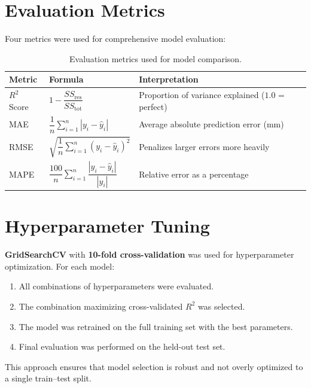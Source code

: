 \section{Evaluation Metrics}

Four metrics were used for comprehensive model evaluation:

\begin{table}[H]
\centering
\caption{Evaluation metrics used for model comparison.}
\label{tab:metrics}
\begin{tabular}{lll}
\toprule
\textbf{Metric} & \textbf{Formula} & \textbf{Interpretation} \\
\midrule
$R^2$ Score & $1 - \dfrac{SS_{\text{res}}}{SS_{\text{tot}}}$ & Proportion of variance explained ($1.0$ = perfect) \\[1em]
MAE & $\dfrac{1}{n}\displaystyle\sum_{i=1}^{n}|y_i - \hat{y}_i|$ & Average absolute prediction error (mm) \\[1em]
RMSE & $\sqrt{\dfrac{1}{n}\displaystyle\sum_{i=1}^{n}(y_i - \hat{y}_i)^2}$ & Penalizes larger errors more heavily \\[1em]
MAPE & $\dfrac{100}{n}\displaystyle\sum_{i=1}^{n}\dfrac{|y_i - \hat{y}_i|}{|y_i|}$ & Relative error as a percentage \\
\bottomrule
\end{tabular}
\end{table}


\section{Hyperparameter Tuning}

\textbf{GridSearchCV} with \textbf{10-fold cross-validation} was used for hyperparameter optimization. For each model:

\begin{enumerate}
    \item All combinations of hyperparameters were evaluated.
    \item The combination maximizing cross-validated $R^2$ was selected.
    \item The model was retrained on the full training set with the best parameters.
    \item Final evaluation was performed on the held-out test set.
\end{enumerate}

This approach ensures that model selection is robust and not overly optimized to a single train--test split.
